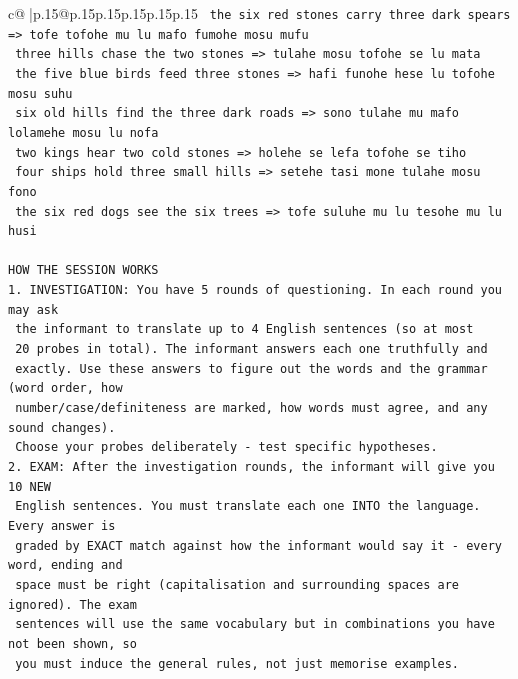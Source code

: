 \documentclass{article}
\begin{document}
{\begin{supertabular}{c@{$\;$}|p{.15\linewidth}@{}p{.15\linewidth}p{.15\linewidth}p{.15\linewidth}p{.15\linewidth}p{.15\linewidth}}
{{{\texttt{    the six red stones carry three dark spears  =>  tofe tofohe mu lu mafo fumohe mosu mufu} \\
\texttt{    three hills chase the two stones  =>  tulahe mosu tofohe se lu mata} \\
\texttt{    the five blue birds feed three stones  =>  hafi funohe hese lu tofohe mosu suhu} \\
\texttt{    six old hills find the three dark roads  =>  sono tulahe mu mafo lolamehe mosu lu nofa} \\
\texttt{    two kings hear two cold stones  =>  holehe se lefa tofohe se tiho} \\
\texttt{    four ships hold three small hills  =>  setehe tasi mone tulahe mosu fono} \\
\texttt{    the six red dogs see the six trees  =>  tofe suluhe mu lu tesohe mu lu husi} \\
\\ 
\texttt{HOW THE SESSION WORKS} \\
\texttt{1. INVESTIGATION: You have 5 rounds of questioning. In each round you may ask} \\
\texttt{   the informant to translate up to 4 English sentences (so at most} \\
\texttt{   20 probes in total). The informant answers each one truthfully and} \\
\texttt{   exactly. Use these answers to figure out the words and the grammar (word order, how} \\
\texttt{   number/case/definiteness are marked, how words must agree, and any sound changes).} \\
\texttt{   Choose your probes deliberately {-} test specific hypotheses.} \\
\texttt{2. EXAM: After the investigation rounds, the informant will give you 10 NEW} \\
\texttt{   English sentences. You must translate each one INTO the language. Every answer is} \\
\texttt{   graded by EXACT match against how the informant would say it {-} every word, ending and} \\
\texttt{   space must be right (capitalisation and surrounding spaces are ignored). The exam} \\
\texttt{   sentences will use the same vocabulary but in combinations you have not been shown, so} \\
\texttt{   you must induce the general rules, not just memorise examples.} \\
}}}
\end{supertabular}}
\end{document}
